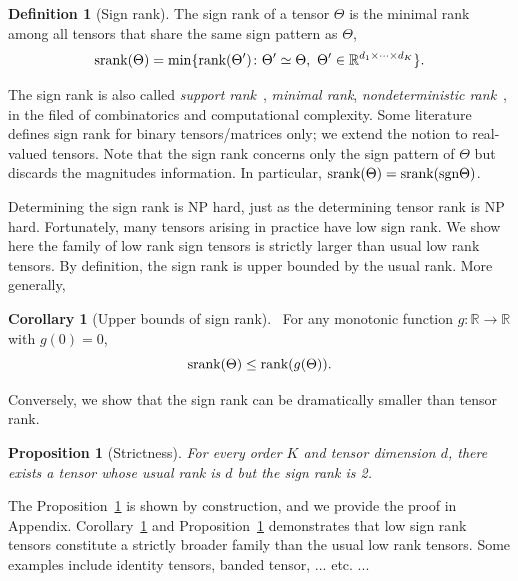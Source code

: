 \documentclass{article}
\theoremstyle{plain}
\newtheorem{prop}{Proposition}
\theoremstyle{definition}
\newtheorem{defn}{Definition}
\newtheorem{cor}{Corollary}
\def\sign{\textup{sgn}}
\def\srank{\textup{srank}}
\def\rank{\textup{rank}}
\def\caliP{\mathscr{P}_{\textup{sgn}}}
\begin{document}
\begin{defn}[Sign rank]
The sign rank of a tensor $\Theta$ is the minimal rank among all tensors that share the same sign pattern as $\Theta$,
\[
\srank(\Theta) = \min \{\rank(\Theta')\colon  \Theta'\simeq \Theta,\ \Theta'\in\mathbb{R}^{d_1\times \cdots \times d_K}\}.
\]
\end{defn}
The sign rank is also called \emph{support rank}~\cite{cohn2013fast}, \emph{minimal rank}, \emph{nondeterministic rank}~\cite{de2003nondeterministic}, in the filed of combinatorics and computational complexity. Some literature defines sign rank for binary tensors/matrices only; we extend the notion to real-valued tensors. Note that the sign rank concerns only the sign pattern of $\Theta$ but discards the magnitudes information. In particular, $\srank(\Theta)=\srank(\sign \Theta)$. 

Determining the sign rank is NP hard, just as the determining tensor rank is NP hard. Fortunately, many tensors arising in practice have low sign rank. We show here the family of low rank sign tensors is strictly larger than usual low rank tensors. By definition, the sign rank is upper bounded by the usual rank. More generally, 
\begin{cor}[Upper bounds of sign rank]~\label{cor:monotonic} For any monotonic function $g\colon \mathbb{R}\to \mathbb{R}$ with $g(0)=0$, 
\[
\textup{srank}(\Theta)\leq\rank(g(\Theta)).
\]
\end{cor}
Conversely, we show that the sign rank can be dramatically smaller than tensor rank. 
\begin{prop}[Strictness]\label{prop:extention}For every order $K$ and tensor dimension $d$, there exists a tensor whose usual rank is $d$ but the sign rank is 2. 
\end{prop}
The Proposition~\ref{prop:extention} is shown by construction, and we provide the proof in Appendix. Corollary~\ref{cor:monotonic} and Proposition~\ref{prop:extention} demonstrates that low sign rank tensors constitute a strictly broader family than the usual low rank tensors. Some examples include identity tensors, banded tensor, ... etc. ...
\end{document}
